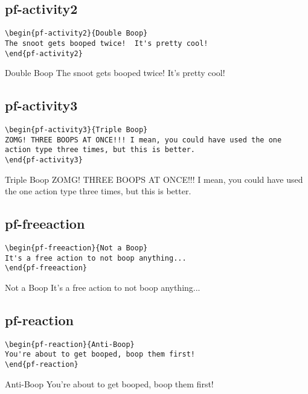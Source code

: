 \begin{multicols}{2}
\subsection{pf-activity2}
\begin{verbatim}
\begin{pf-activity2}{Double Boop}
The snoot gets booped twice!  It's pretty cool!
\end{pf-activity2}
\end{verbatim}
\begin{pf-activity2}{Double Boop}
The snoot gets booped twice!  It's pretty cool!
\end{pf-activity2}

\subsection{pf-activity3}
\begin{verbatim}
\begin{pf-activity3}{Triple Boop}
ZOMG! THREE BOOPS AT ONCE!!! I mean, you could have used the one action type three times, but this is better.
\end{pf-activity3}
\end{verbatim}
\begin{pf-activity3}{Triple Boop}
ZOMG! THREE BOOPS AT ONCE!!! I mean, you could have used the one action type three times, but this is better.
\end{pf-activity3}

\subsection{pf-freeaction}
\begin{verbatim}
\begin{pf-freeaction}{Not a Boop}
It's a free action to not boop anything...
\end{pf-freeaction}
\end{verbatim}
\begin{pf-freeaction}{Not a Boop}
It's a free action to not boop anything...
\end{pf-freeaction}

\subsection{pf-reaction}
\begin{verbatim}
\begin{pf-reaction}{Anti-Boop}
You're about to get booped, boop them first!
\end{pf-reaction}
\end{verbatim}
\begin{pf-reaction}{Anti-Boop}
You're about to get booped, boop them first!
\end{pf-reaction}


\end{multicols}
